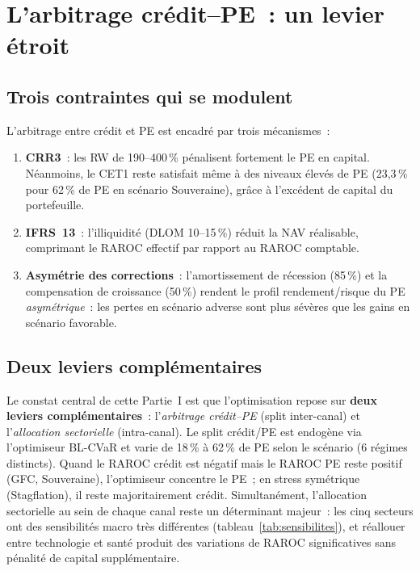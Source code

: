 \documentclass[12pt, a4paper, twoside, openright]{report}
\theoremstyle{definition}
\begin{document}
\section{L'arbitrage crédit--PE~: un levier étroit}
\label{sec:pe:arbitrage}

\subsection{Trois contraintes qui se modulent}

L'arbitrage entre crédit et PE est encadré par trois mécanismes~:

\begin{enumerate}
  \item \textbf{CRR3}~: les RW de 190--400\,\% pénalisent fortement le PE en capital. Néanmoins, le CET1 reste satisfait même à des niveaux élevés de PE (23{,}3\,\% pour 62\,\% de PE en scénario Souveraine), grâce à l'excédent de capital du portefeuille.

  \item \textbf{IFRS~13}~: l'illiquidité (DLOM 10--15\,\%) réduit la NAV réalisable, comprimant le RAROC effectif par rapport au RAROC comptable.

  \item \textbf{Asymétrie des corrections}~: l'amortissement de récession (85\,\%) et la compensation de croissance (50\,\%) rendent le profil rendement/risque du PE \emph{asymétrique}~: les pertes en scénario adverse sont plus sévères que les gains en scénario favorable.
\end{enumerate}

\subsection{Deux leviers complémentaires}

Le constat central de cette Partie~I est que l'optimisation repose sur \textbf{deux leviers complémentaires}~: l'\emph{arbitrage crédit--PE} (split inter-canal) et l'\emph{allocation sectorielle} (intra-canal). Le split crédit/PE est endogène via l'optimiseur BL-CVaR et varie de 18\,\% à 62\,\% de PE selon le scénario (6 régimes distincts). Quand le RAROC crédit est négatif mais le RAROC PE reste positif (GFC, Souveraine), l'optimiseur concentre le PE~; en stress symétrique (Stagflation), il reste majoritairement crédit. Simultanément, l'allocation sectorielle au sein de chaque canal reste un déterminant majeur~: les cinq secteurs ont des sensibilités macro très différentes (tableau~\ref{tab:sensibilites}), et réallouer entre technologie et santé produit des variations de RAROC significatives sans pénalité de capital supplémentaire.
\end{document}
